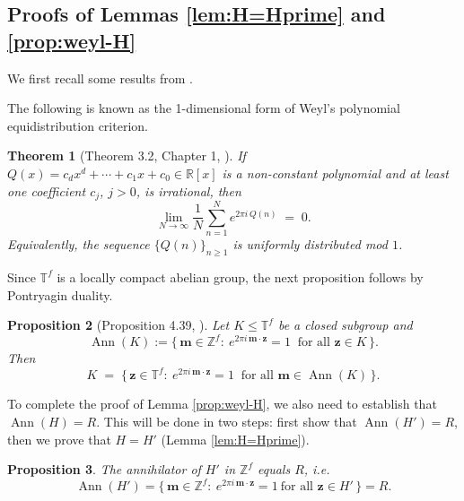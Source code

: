 \documentclass[11pt]{article}
\DeclareMathOperator{\Ann}{Ann}
\newtheorem{theorem}{Theorem}[section]
\newtheorem{proposition}[theorem]{Proposition}
\def\Z{{\mathbb  Z}}
\def \Z{{\mathbb Z}}
\theoremstyle{definition}
\newcommand{\T}{\mathbb T}
\begin{document}
\subsection{Proofs of Lemmas \ref{lem:H=Hprime} and \ref{prop:weyl-H}}
We first recall some results from \cite{book0, book3}.

The following is known as the 1-dimensional form of Weyl's polynomial equidistribution criterion.
\begin{theorem}[Theorem 3.2, Chapter 1, \cite{book3}]\label{pro31}
    If \(Q(x)=c_d x^d+\cdots+c_1 x+c_0\in\mathbb R[x]\) is a non-constant polynomial
and at least one coefficient \(c_j\), $j>0$, is irrational, then
\[
  \lim_{N\to\infty}\frac{1}{N}\sum_{n=1}^{N} e^{2\pi i\, Q(n)} \;=\; 0 .
\]
Equivalently, the sequence $\{Q(n)\}_{n\ge 1}$ is uniformly distributed mod \(1\).
\end{theorem}
Since $\T^f$ is a locally compact abelian group, the next proposition follows by Pontryagin duality.
\begin{proposition}[Proposition 4.39, \cite{book0}]\label{lem:annihilator-ker}
Let $K\le \T^f$ be a closed subgroup and
\[
\Ann(K):=\{\,\mathbf{m}\in\Z^f:\ e^{2\pi i\, \mathbf{m}\cdot \mathbf{z}}=1\ \text{ for all }\mathbf{z}\in K\,\}.
\]
Then
\begin{equation}\label{eq:annihilator-ker}
K \;=\; \big\{\, \mathbf{z}\in\T^f:\ e^{2\pi i\, \mathbf{m}\cdot \mathbf{z}}=1\ \text{ for all } \mathbf{m}\in \Ann(K)\,\big\}.
\end{equation}
\end{proposition}
To complete the proof of Lemma \ref{prop:weyl-H}, we also need to establish that $\Ann(H)=R$. This will be done in two steps: first show that $\Ann(H')=R$, then we prove that $H=H'$ (Lemma \ref{lem:H=Hprime}).
\begin{proposition}\label{lm3.11}
The annihilator of $H'$ in $\Z^f$ equals $R$, i.e.
\[
\Ann(H')=\{\,\mathbf{m}\in\Z^f:\ e^{2\pi i\,\mathbf{m}\cdot \mathbf{z}}=1 \ \text{for all }\mathbf{z}\in H'\,\}=R.
\]
\end{proposition}
\end{document}
